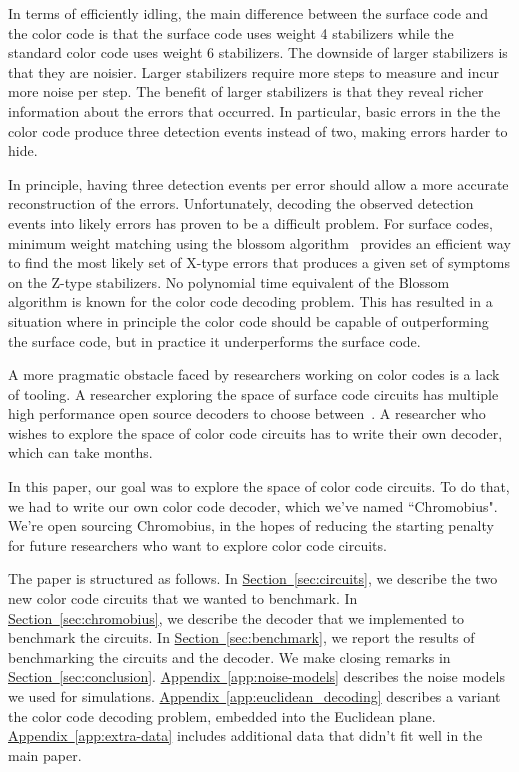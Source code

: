 \documentclass[onecolumn,unpublished,a4paper]{quantumarticle}
\theoremstyle{definition}
\theoremstyle{definition}
\theoremstyle{definition}
\renewcommand{\sec}[1]{\hyperref[sec:#1]{Section~\ref*{sec:#1}}}
\DeclareRobustCommand{\app}[1]{\hyperref[app:#1]{Appendix~\ref*{app:#1}}}
\begin{document}
In terms of efficiently idling, the main difference between the surface code and the color code is that the surface code uses weight 4 stabilizers while the standard color code uses weight 6 stabilizers.
The downside of larger stabilizers is that they are noisier.
Larger stabilizers require more steps to measure and incur more noise per step.
The benefit of larger stabilizers is that they reveal richer information about the errors that occurred.
In particular, basic errors in the the color code produce three detection events instead of two, making errors harder to hide.

In principle, having three detection events per error should allow a more accurate reconstruction of the errors.
Unfortunately, decoding the observed detection events into likely errors has proven to be a difficult problem.
For surface codes, minimum weight matching using the blossom algorithm~\cite{edmonds1965paths} provides an efficient way to find the most likely set of X-type errors that produces a given set of symptoms on the Z-type stabilizers.
No polynomial time equivalent of the Blossom algorithm is known for the color code decoding problem.
This has resulted in a situation where in principle the color code should be capable of outperforming the surface code, but in practice it underperforms the surface code.

A more pragmatic obstacle faced by researchers working on color codes is a lack of tooling.
A researcher exploring the space of surface code circuits has multiple high performance open source decoders to choose between~\cite{higgott2023sparseblossom,wu2023fusionblossom}.
A researcher who wishes to explore the space of color code circuits has to write their own decoder, which can take months.

In this paper, our goal was to explore the space of color code circuits.
To do that, we had to write our own color code decoder, which we've named ``Chromobius".
We're open sourcing Chromobius, in the hopes of reducing the starting penalty for future researchers who want to explore color code circuits.

The paper is structured as follows.
In \sec{circuits}, we describe the two new color code circuits that we wanted to benchmark.
In \sec{chromobius}, we describe the decoder that we implemented to benchmark the circuits.
In \sec{benchmark}, we report the results of benchmarking the circuits and the decoder.
We make closing remarks in \sec{conclusion}.
\app{noise-models} describes the noise models we used for simulations.
\app{euclidean_decoding} describes a variant the color code decoding problem, embedded into the Euclidean plane.
\app{extra-data} includes additional data that didn't fit well in the main paper.
\end{document}
